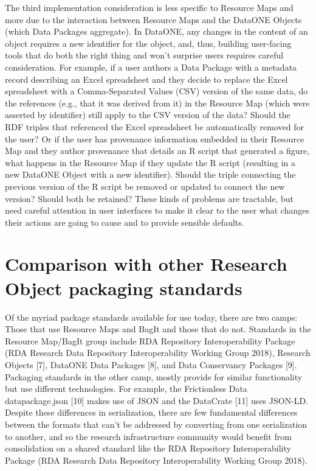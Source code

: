 \documentclass[conference]{IEEEtran}
\begin{document}
The third implementation consideration is less specific to Resource Maps and more due to the interaction between Resource Maps and the DataONE Objects (which Data Packages aggregate).
In DataONE, any changes in the content of an object requires a new identifier for the object, and, thus, building user-facing tools that do both the right thing and won’t surprise users requires careful consideration.
For example, if a user authors a Data Package with a metadata record describing an Excel spreadsheet and they decide to replace the Excel spreadsheet with a Comma-Separated Values (CSV) version of the same data, do the references (e.g., that it was derived from it) in the Resource Map (which were asserted by identifier) still apply to the CSV version of the data?
Should the RDF triples that referenced the Excel spreadsheet be automatically removed for the user?
Or if the user has provenance information embedded in their Resource Map and they author provenance that details an R script that generated a figure, what happens in the Resource Map if they update the R script (resulting in a new DataONE Object with a new identifier).
Should the triple connecting the previous version of the R script be removed or updated to connect the new version?
Should both be retained?
These kinds of problems are tractable, but need careful attention in user interfaces to make it clear to the user what changes their actions are going to cause and to provide sensible defaults.

\section{Comparison with other Research Object packaging standards}

Of the myriad package standards available for use today, there are two camps: Those that use Resource Maps and BagIt and those that do not.
Standards in the Resource Map/BagIt group include RDA Repository Interoperability Package (RDA Research Data Repository Interoperability Working Group 2018), Research Objects [7], DataONE Data Packages [8], and Data Conservancy Packages [9].
Packaging standards in the other camp, mostly provide for similar functionality but use different technologies.
For example, the Frictionless Data datapackage.json [10] makes use of JSON and the DataCrate [11] uses JSON-LD.
Despite these differences in serialization, there are few fundamental differences between the formats that can’t be addressed by converting from one serialization to another, and so the research infrastructure community would benefit from consolidation on a shared standard like the RDA Repository Interoperability Package (RDA Research Data Repository Interoperability Working Group 2018).
\end{document}
